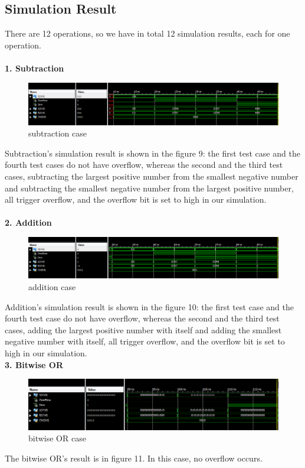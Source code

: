 \documentclass{article}
\begin{document}
\subsection{Simulation Result}

There are 12 operations, so we have in total 12 simulation results, each for one operation.\\
\\
\textbf{1. Subtraction}\\
\begin{figure}[!htb]
  \centering
  \includegraphics[width=\linewidth]{0000.PNG}
  \caption{subtraction case}
  \label{fig:sub}
\end{figure}
Subtraction's simulation result is shown in the figure 9: the first test case and the fourth test cases do not have overflow, whereas the second and the third test cases, subtracting the largest positive number from the smallest negative number and subtracting the smallest negative number from the largest positive number, all trigger overflow, and the overflow bit is set to high in our simulation. 
\\
\\
\textbf{2. Addition}
\begin{figure}[!htb]
  \centering
  \includegraphics[width=\linewidth]{0001.PNG}
  \caption{addition case}
  \label{fig:add}
\end{figure}

Addition's simulation result is shown in the figure 10: the first test case and the fourth test case do not have overflow, whereas the second and the third test cases, adding the largest positive number with itself and adding the smallest negative number with itself, all trigger overflow, and the overflow bit is set to high in our simulation. 
\\
\textbf{3. Bitwise OR}\\
\begin{figure}[!htb]
  \centering
  \includegraphics[width=\linewidth]{0010.PNG}
  \caption{bitwise OR case}
  \label{fig:or}
\end{figure}
The bitwise OR's result is in figure 11. In this case, no overflow occurs. \\
\end{document}
